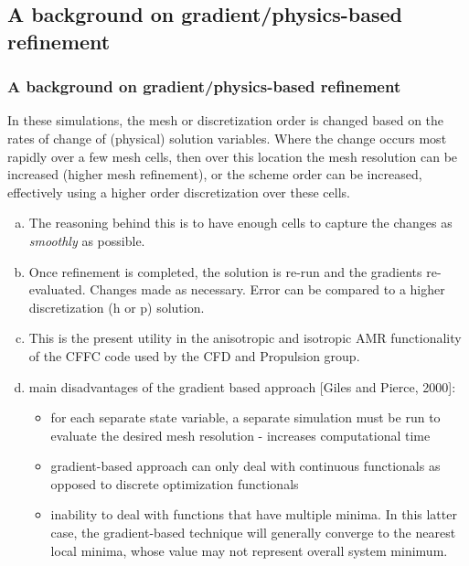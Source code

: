 \documentclass{beamer}
\begin{document}
\subsection[Gradient]{A background on gradient/physics-based refinement}
\begin{frame}%
\scriptsize
\frametitle{A background on gradient/physics-based refinement}
In these simulations, the mesh or discretization order is changed based on the rates of change of (physical) solution variables.\newline
Where the change occurs most rapidly over a few mesh cells, then over this location the mesh resolution can be increased (higher mesh refinement), or the scheme order can be increased, effectively using a higher order discretization over these cells.

\begin{enumerate}[(a)]
\item The reasoning behind this is to have enough cells to capture the changes as \textit{smoothly} as possible.
\item Once refinement is completed, the solution is re-run and the gradients re-evaluated. Changes made as necessary. Error can be compared to a higher discretization (h or p) solution.
\item This is the present utility in the anisotropic and isotropic AMR functionality of the CFFC code used by the CFD and Propulsion group.
\item main disadvantages of the gradient based approach [Giles and Pierce, 2000]:
\begin{itemize}
\tiny
\item for each separate state variable, a separate simulation must be run to evaluate the desired mesh resolution - increases computational time
\item gradient-based approach can only deal with continuous functionals as opposed to discrete optimization functionals
\item inability to deal with functions that have multiple minima. In this latter case, the gradient-based technique will generally converge to the nearest local minima, whose value may not represent overall system minimum.
\end{itemize}
\end{enumerate}
\end{frame}

\end{document}
